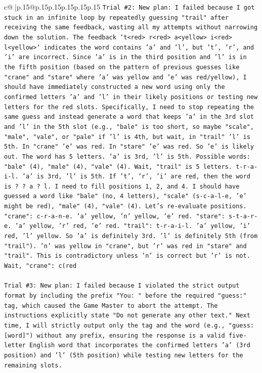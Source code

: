 \documentclass{article}
\begin{document}
{\begin{supertabular}{c@{$\;$}|p{.15\linewidth}@{}p{.15\linewidth}p{.15\linewidth}p{.15\linewidth}p{.15\linewidth}p{.15\linewidth}}
{{{\texttt{Trial \#2: New plan: I failed because I got stuck in an infinite loop by repeatedly guessing "trail" after receiving the same feedback, wasting all my attempts without narrowing down the solution. The feedback `t<red> r<red> a<yellow> i<red> l<yellow>` indicates the word contains 'a' and 'l', but 't', 'r', and 'i' are incorrect. Since 'a' is in the third position and 'l' is in the fifth position (based on the pattern of previous guesses like "crane" and "stare" where 'a' was yellow and 'e' was red/yellow), I should have immediately constructed a new word using only the confirmed letters 'a' and 'l' in their likely positions or testing new letters for the red slots. Specifically, I need to stop repeating the same guess and instead generate a word that keeps 'a' in the 3rd slot and 'l' in the 5th slot (e.g., "bale" is too short, so maybe "scale", "male", "vale", or "pale" if 'l' is 4th, but wait, in "trail" 'l' is 5th. In "crane" 'e' was red. In "stare" 'e' was red. So 'e' is likely out. The word has 5 letters. 'a' is 3rd, 'l' is 5th. Possible words: "bale" (4), "male" (4), "vale" (4). Wait, "trail" is 5 letters. t{-}r{-}a{-}i{-}l. 'a' is 3rd, 'l' is 5th. If 't', 'r', 'i' are red, then the word is ? ? a ? l. I need to fill positions 1, 2, and 4. I should have guessed a word like "bale" (no, 4 letters), "scale" (s{-}c{-}a{-}l{-}e, 'e' might be red), "male" (4), "vale" (4). Let's re{-}evaluate positions. "crane": c{-}r{-}a{-}n{-}e. 'a' yellow, 'n' yellow, 'e' red. "stare": s{-}t{-}a{-}r{-}e. 'a' yellow, 'r' red, 'e' red. "trail": t{-}r{-}a{-}i{-}l. 'a' yellow, 'i' red, 'l' yellow. So 'a' is definitely 3rd. 'l' is definitely 5th (from "trail"). 'n' was yellow in "crane", but 'r' was red in "stare" and "trail". This is contradictory unless 'n' is correct but 'r' is not. Wait, "crane": c(red} \\
\\ 
\texttt{Trial \#3: New plan: I failed because I violated the strict output format by including the prefix "You: " before the required "guess:" tag, which caused the Game Master to abort the attempt. The instructions explicitly state "Do not generate any other text." Next time, I will strictly output only the tag and the word (e.g., "guess: {[}word{]}") without any prefix, ensuring the response is a valid five{-}letter English word that incorporates the confirmed letters 'a' (3rd position) and 'l' (5th position) while testing new letters for the remaining slots.} \\
\\ 
\\ 
}}}
\end{supertabular}}
\end{document}

